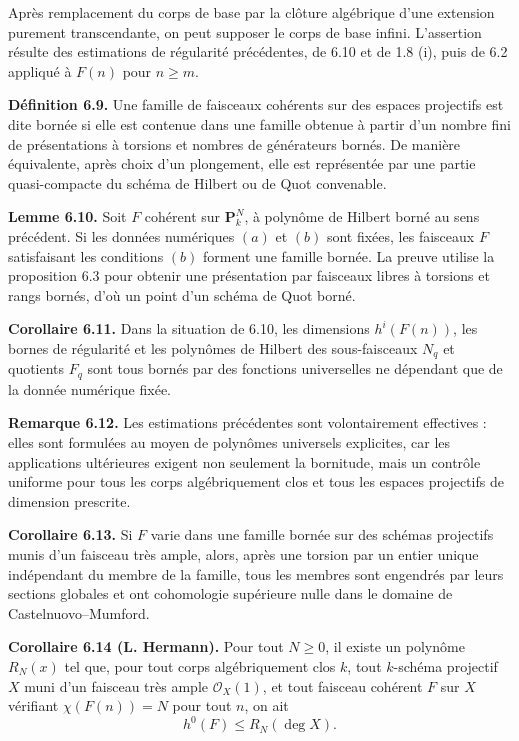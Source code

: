 \documentclass[11pt]{article}
\begin{document}
Apr\`es remplacement du corps de base par la cl\^oture alg\'ebrique d'une extension purement transcendante, on peut supposer le corps de base infini. L'assertion r\'esulte des estimations de r\'egularit\'e pr\'ec\'edentes, de 6.10 et de 1.8 (i), puis de 6.2 appliqu\'e \`a $F(n)$ pour $n\ge m$.

\textbf{D\'efinition 6.9.} Une famille de faisceaux coh\'erents sur des espaces projectifs est dite born\'ee si elle est contenue dans une famille obtenue \`a partir d'un nombre fini de pr\'esentations \`a torsions et nombres de g\'en\'erateurs born\'es. De mani\`ere \'equivalente, apr\`es choix d'un plongement, elle est repr\'esent\'ee par une partie quasi-compacte du sch\'ema de Hilbert ou de Quot convenable.

\textbf{Lemme 6.10.} Soit $F$ coh\'erent sur $\mathbf P^N_k$, \`a polyn\^ome de Hilbert born\'e au sens pr\'ec\'edent. Si les donn\'ees num\'eriques $(a)$ et $(b)$ sont fix\'ees, les faisceaux $F$ satisfaisant les conditions $(b)$ forment une famille born\'ee. La preuve utilise la proposition 6.3 pour obtenir une pr\'esentation par faisceaux libres \`a torsions et rangs born\'es, d'o\`u un point d'un sch\'ema de Quot born\'e.

\textbf{Corollaire 6.11.} Dans la situation de 6.10, les dimensions $h^i(F(n))$, les bornes de r\'egularit\'e et les polyn\^omes de Hilbert des sous-faisceaux $N_q$ et quotients $F_q$ sont tous born\'es par des fonctions universelles ne d\'ependant que de la donn\'ee num\'erique fix\'ee.

\textbf{Remarque 6.12.} Les estimations pr\'ec\'edentes sont volontairement effectives : elles sont formul\'ees au moyen de polyn\^omes universels explicites, car les applications ult\'erieures exigent non seulement la bornitude, mais un contr\^ole uniforme pour tous les corps alg\'ebriquement clos et tous les espaces projectifs de dimension prescrite.

\textbf{Corollaire 6.13.} Si $F$ varie dans une famille born\'ee sur des sch\'emas projectifs munis d'un faisceau tr\`es ample, alors, apr\`es une torsion par un entier unique ind\'ependant du membre de la famille, tous les membres sont engendr\'es par leurs sections globales et ont cohomologie sup\'erieure nulle dans le domaine de Castelnuovo--Mumford.

\textbf{Corollaire 6.14 (L. Hermann).} Pour tout $N\ge0$, il existe un polyn\^ome $R_N(x)$ tel que, pour tout corps alg\'ebriquement clos $k$, tout $k$-sch\'ema projectif $X$ muni d'un faisceau tr\`es ample $\mathcal O_X(1)$, et tout faisceau coh\'erent $F$ sur $X$ v\'erifiant $\chi(F(n))=N$ pour tout $n$, on ait
\[
   h^0(F)\le R_N(\deg X).
\]
\end{document}

